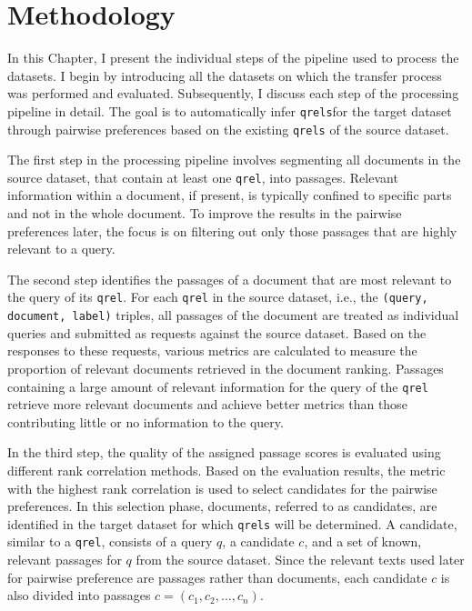 \chapter{Methodology}\label{methodology}

In this Chapter, I present the individual steps of the pipeline used to process the datasets. I begin by introducing all the datasets on which the transfer process was performed and evaluated. Subsequently, I discuss each step of the processing pipeline in detail. The goal is to automatically infer \texttt{qrels}for the target dataset through pairwise preferences based on the existing \texttt{qrels} of the source dataset.

The first step in the processing pipeline involves segmenting all documents in the source dataset, that contain at least one \texttt{qrel}, into passages. Relevant information within a document, if present, is typically confined to specific parts and not in the whole document. To improve the results in the pairwise preferences later, the focus is on filtering out only those passages that are highly relevant to a query.

The second step identifies the passages of a document that are most relevant to the query of its \texttt{qrel}. For each \texttt{qrel} in the source dataset, i.e., the \texttt{(query, document, label)} triples, all passages of the document are treated as individual queries and submitted as requests against the source dataset. Based on the responses to these requests, various metrics are calculated to measure the proportion of relevant documents retrieved in the document ranking. Passages containing a large amount of relevant information for the query of the \texttt{qrel} retrieve more relevant documents and achieve better metrics than those contributing little or no information to the query.

In the third step, the quality of the assigned passage scores is evaluated using different rank correlation methods. Based on the evaluation results, the metric with the highest rank correlation is used to select candidates for the pairwise preferences. In this selection phase, documents, referred to as candidates, are identified in the target dataset for which \texttt{qrels} will be determined. A candidate, similar to a \texttt{qrel}, consists of a query $q$, a candidate $c$, and a set of known, relevant passages for $q$ from the source dataset. Since the relevant texts used later for pairwise preference are passages rather than documents, each candidate $c$ is also divided into passages $c=(c_1, c_2, ..., c_n)$.

